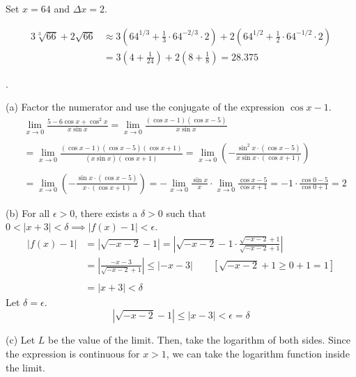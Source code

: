 \documentclass{article}
\begin{document}
\hfill

\noindent Set $x = 64$ and $\Delta x = 2$.

\begin{align*}3\sqrt[3]{66}+2\sqrt{66}&\approx3\left(64^{1/3}+\frac13\cdot64^{-2/3}\cdot2\right)+2\left(64^{1/2}+\frac{1}2\cdot64^{-1/2}\cdot2\right)\\&=3\left(4+\frac1{24}\right)+2\left(8+\frac18\right)=\boxed{28.375}\end{align*}

\newpage

.

\hfill

\noindent (a) Factor the numerator and use the conjugate of the expression $\cos x-1$.
\begin{align*}
&\lim_{x\to0}\frac{5-6\cos x + \cos^2x}{x\sin x}=\lim_{x\to0}\frac{(\cos x -1)(\cos x-5)}{x\sin x} \\\\&=\lim_{x\to0}\frac{(\cos x -1)(\cos x-5)(\cos x +1)}{(x\sin x)(\cos x +1)}
=\lim_{x\to0}\left(-\frac{\sin^2x\cdot(\cos x -5)}{x\sin x \cdot(\cos x +1)}\right)\\\\&=\lim_{x\to0}\left(-\frac{\sin x\cdot(\cos x -5)}{x \cdot(\cos x +1)}\right)=-\lim_{x\to0}\frac{\sin{x}} x\cdot \lim_{x\to0}\frac{\cos x -5}{\cos x +1}=-1\cdot\frac{\cos0 -5}{\cos0+1} = \boxed{2}
\end{align*}

\hfill

\noindent (b) For all $\epsilon > 0$, there exists a $\delta > 0$ such that $0<\left|x+3\right|<\delta\implies\left|f(x)-1\right|<\epsilon$.
\begin{align*}
\left|f(x)-1\right|&=\left|\sqrt{-x-2}-1\right|=\left|\sqrt{-x-2}-1\cdot\frac{\sqrt{-x-2}+1}{\sqrt{-x-2}+1}\right|\\&=\left|\frac{-x-3}{\sqrt{-x-2}+1}\right|\leq\left|-x-3\right|\qquad\left[\sqrt{-x-2}+1\geq0+1=1\right]\\\\&=\left|x+3\right|<\delta
\end{align*}
\noindent Let $\delta=\epsilon$.
\[\left|\sqrt{-x-2}-1\right|\leq|x-3|<\epsilon=\delta\]

\hfill

\noindent (c) Let $L$ be the value of the limit. Then, take the logarithm of both sides. Since the expression is continuous for $x>1$, we can take the logarithm function inside the limit.
\end{document}
